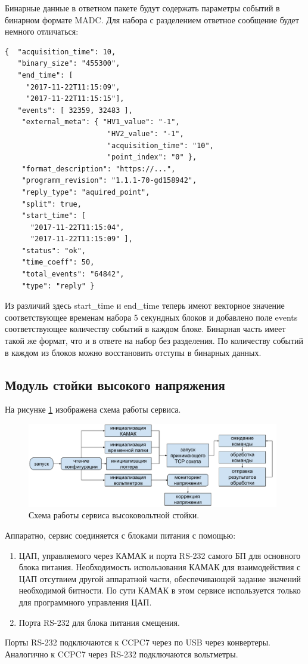 \documentclass[a4paper,14pt]{extreport}
\begin{document}
Бинарные данные в ответном пакете будут содержать параметры событий в бинарном формате MADC.
Для набора с разделением ответное сообщение будет немного отличаться:
\begin{lstlisting}[caption={Сообщение с набранными событиями (набор с разделением).}, captionpos=b]
{  "acquisition_time": 10,
   "binary_size": "455300",
   "end_time": [
     "2017-11-22T11:15:09", 
     "2017-11-22T11:15:15"],
   "events": [ 32359, 32483 ],
    "external_meta": { "HV1_value": "-1",
                        "HV2_value": "-1",
                        "acquisition_time": "10",
                        "point_index": "0" },
    "format_description": "https://...",
    "programm_revision": "1.1.1-70-gd158942",
    "reply_type": "aquired_point",
    "split": true,
    "start_time": [ 
      "2017-11-22T11:15:04", 
      "2017-11-22T11:15:09" ],
    "status": "ok",
    "time_coeff": 50,
    "total_events": "64842",
    "type": "reply" }
\end{lstlisting}
Из различий здесь start\_time и end\_time теперь имеют векторное значение соответствующее временам набора 5 секундных блоков и добавлено поле events соответствующее количеству событий в каждом блоке. Бинарная часть имеет такой же формат, что и в ответе на набор без разделения. По количеству событий в каждом из блоков можно восстановить отступы в бинарных данных.

\subsection{Модуль стойки высокого напряжения}
На рисунке \ref{fig:numass-hv-workflow} изображена схема работы сервиса.
\begin{figure}
  \centering
  \includegraphics[width = 0.98\textwidth]{img/nu_mass_setup/hv_workflow.pdf}
    \caption{Схема работы сервиса высоковольтной стойки.}
    \label{fig:numass-hv-workflow}
\end{figure}
Аппаратно, сервис соединяется с блоками питания с помощью:
\begin{enumerate}
    \item ЦАП, управляемого через КАМАК и порта RS-232 самого БП для основного блока питания. Необходимость использования КАМАК для взаимодействия с ЦАП отсутвием другой аппаратной части, обеспечивающей задание значений необходимой битности. По сути КАМАК в этом сервисе используется только для программного управления ЦАП.
    \item Порта RS-232 для блока питания смещения.
\end{enumerate}
Порты RS-232 подключаются к CCPC7 через по USB через конвертеры. Аналогично к CCPC7 через RS-232 подключаются вольтметры.
\end{document}

